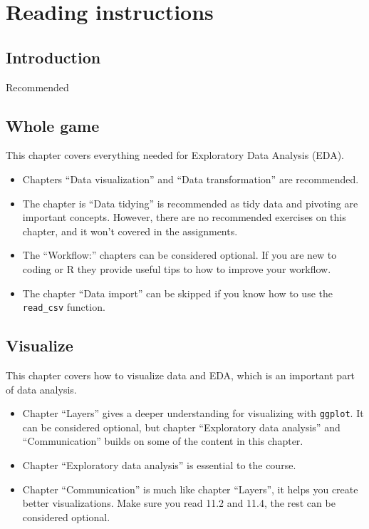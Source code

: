 \documentclass[
  letterpaper,
  DIV=11,
  numbers=noendperiod]{scrreprt}
\providecommand{\tightlist}{%
  \setlength{\itemsep}{0pt}\setlength{\parskip}{0pt}}\usepackage{longtable,booktabs,array}
\begin{document}
\chapter{Reading instructions}\label{reading-instructions}

\section*{Introduction}\label{introduction}


Recommended

\section*{Whole game}\label{whole-game}


This chapter covers everything needed for Exploratory Data Analysis
(EDA).

\begin{itemize}
\tightlist
\item
  Chapters ``Data visualization'' and ``Data transformation'' are
  recommended.
\item
  The chapter is ``Data tidying'' is recommended as tidy data and
  pivoting are important concepts. However, there are no recommended
  exercises on this chapter, and it won't covered in the assignments.
\item
  The ``Workflow:'' chapters can be considered optional. If you are new
  to coding or R they provide useful tips to how to improve your
  workflow.
\item
  The chapter ``Data import'' can be skipped if you know how to use the
  \texttt{read\_csv} function.
\end{itemize}

\section*{Visualize}\label{visualize}


This chapter covers how to visualize data and EDA, which is an important
part of data analysis.

\begin{itemize}
\tightlist
\item
  Chapter ``Layers'' gives a deeper understanding for visualizing with
  \texttt{ggplot}. It can be considered optional, but chapter
  ``Exploratory data analysis'' and ``Communication'' builds on some of
  the content in this chapter.
\item
  Chapter ``Exploratory data analysis'' is essential to the course.
\item
  Chapter ``Communication'' is much like chapter ``Layers'', it helps
  you create better visualizations. Make sure you read 11.2 and 11.4,
  the rest can be considered optional.
\end{itemize}
\end{document}
